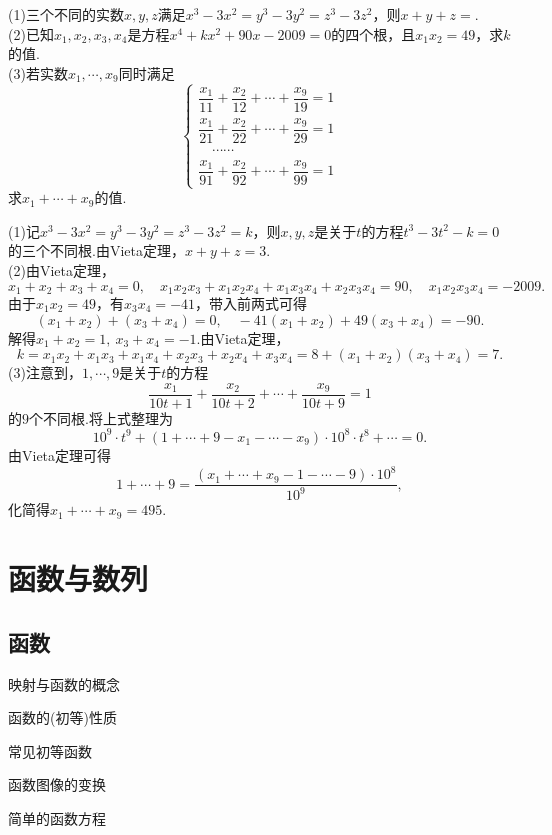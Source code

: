 \documentclass[lang=cn, zihao=5]{elegantbook}
\newcommand{\tk}{\uline{\hspace{4em}}}
\begin{document}
\begin{example}
	(1)三个不同的实数$x,y,z$满足$x^3-3x^2=y^3-3y^2=z^3-3z^2$，则$x+y+z=$\tk . \\
	(2)已知$x_1,x_2,x_3,x_4$是方程$x^4+kx^2+90x-2009=0$的四个根，且$x_1x_2=49$，求$k$的值. \\
	(3)若实数$x_1, \cdots ,x_9$同时满足$$\begin{cases}
		\dfrac{x_1}{11} + \dfrac{x_2}{12} + \cdots + \dfrac{x_9}{19} = 1 \\
		\dfrac{x_1}{21} + \dfrac{x_2}{22} + \cdots + \dfrac{x_9}{29} = 1 \\ 
		\quad \cdots \cdots \\
		\dfrac{x_1}{91} + \dfrac{x_2}{92} + \cdots + \dfrac{x_9}{99} = 1
	\end{cases}$$
	求$x_1+ \cdots + x_9$的值.
\end{example}
\begin{solution}
	(1)记$x^3-3x^2=y^3-3y^2=z^3-3z^2=k$，则$x,y,z$是关于$t$的方程$t^3-3t^2-k=0$的三个不同根.由Vieta定理，$x+y+z=3$. \\
	(2)由Vieta定理，$$x_1+x_2+x_3+x_4=0,\quad x_1x_2x_3+x_1x_2x_4+x_1x_3x_4+x_2x_3x_4=90,\quad x_1x_2x_3x_4=-2009.$$
	由于$x_1x_2=49$，有$x_3x_4=-41$，带入前两式可得$$(x_1+x_2)+(x_3+x_4)=0,\quad -41(x_1+x_2)+49(x_3+x_4)=-90.$$
	解得$x_1+x_2=1,~x_3+x_4=-1$.由Vieta定理，$$k=x_1x_2+x_1x_3+x_1x_4+x_2x_3+x_2x_4+x_3x_4=8+(x_1+x_2)(x_3+x_4)=7.$$
	(3)注意到，$1, \cdots ,9$是关于$t$的方程$$\frac{x_1}{10t+1} + \frac{x_2}{10t+2} + \cdots + \frac{x_9}{10t+9} = 1$$
	的$9$个不同根.将上式整理为$$10^9 \cdot t^{9} + (1 + \cdots + 9 - x_1 - \cdots - x_9) \cdot 10^8 \cdot t^{8} + \cdots = 0.$$
	由Vieta定理可得$$1+\cdots +9 = \frac{(x_1 + \cdots + x_9 - 1 - \cdots - 9) \cdot 10^8}{10^9},$$
	化简得$x_1 + \cdots + x_9 = 495$.
\end{solution}

\part{函数与数列}

\chapter{函数}

\begin{introduction}
	\item 映射与函数的概念
	\item 函数的(初等)性质
	\item 常见初等函数
	\item 函数图像的变换
	\item 简单的函数方程
\end{introduction}
\end{document}
